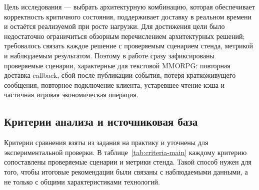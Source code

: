 \documentclass[a4paper,14pt]{extarticle}
\numberwithin{figure}{section}
\numberwithin{table}{section}
\begin{document}
Цель исследования --- выбрать архитектурную комбинацию, которая обеспечивает корректность критичного состояния, поддерживает доставку в реальном времени и остаётся реализуемой при росте нагрузки. Для достижения цели было недостаточно ограничиться обзорным перечислением архитектурных решений; требовалось связать каждое решение с проверяемым сценарием стенда, метрикой и наблюдаемым результатом. Поэтому в работе сразу зафиксированы проверяемые сценарии, характерные для текстовой MMORPG: повторная доставка callback, сбой после публикации события, потеря краткоживущего сообщения, повторное подключение клиента, устаревшее чтение кэша и частичная игровая экономическая операция.

\subsection{Критерии анализа и источниковая база}
Критерии сравнения взяты из задания на практику и уточнены для экспериментальной проверки. В таблице~\ref{tab:criteria-main} каждому критерию сопоставлены проверяемые сценарии и метрики стенда. Такой способ нужен для того, чтобы итоговые рекомендации были связаны с наблюдаемыми данными, а не только с общими характеристиками технологий.
\end{document}
